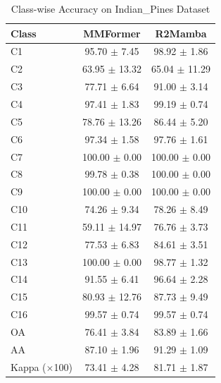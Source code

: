 \begin{table}[htbp]
\centering
\caption{Class-wise Accuracy on Indian\_Pines Dataset}
\label{tab:indian_pines_classwise}
\begin{tabular}{lcc}
\toprule
Class & MMFormer & R2Mamba \\
\midrule
C1 & 95.70 $\pm$ 7.45 & 98.92 $\pm$ 1.86 \\
C2 & 63.95 $\pm$ 13.32 & 65.04 $\pm$ 11.29 \\
C3 & 77.71 $\pm$ 6.64 & 91.00 $\pm$ 3.14 \\
C4 & 97.41 $\pm$ 1.83 & 99.19 $\pm$ 0.74 \\
C5 & 78.76 $\pm$ 13.26 & 86.44 $\pm$ 5.20 \\
C6 & 97.34 $\pm$ 1.58 & 97.76 $\pm$ 1.61 \\
C7 & 100.00 $\pm$ 0.00 & 100.00 $\pm$ 0.00 \\
C8 & 99.78 $\pm$ 0.38 & 100.00 $\pm$ 0.00 \\
C9 & 100.00 $\pm$ 0.00 & 100.00 $\pm$ 0.00 \\
C10 & 74.26 $\pm$ 9.34 & 78.26 $\pm$ 8.49 \\
C11 & 59.11 $\pm$ 14.97 & 76.76 $\pm$ 3.73 \\
C12 & 77.53 $\pm$ 6.83 & 84.61 $\pm$ 3.51 \\
C13 & 100.00 $\pm$ 0.00 & 98.77 $\pm$ 1.32 \\
C14 & 91.55 $\pm$ 6.41 & 96.64 $\pm$ 2.28 \\
C15 & 80.93 $\pm$ 12.76 & 87.73 $\pm$ 9.49 \\
C16 & 99.57 $\pm$ 0.74 & 99.57 $\pm$ 0.74 \\
\midrule
OA & 76.41 $\pm$ 3.84 & 83.89 $\pm$ 1.66 \\
AA & 87.10 $\pm$ 1.96 & 91.29 $\pm$ 1.09 \\
Kappa ($\times$100) & 73.41 $\pm$ 4.28 & 81.71 $\pm$ 1.87 \\
\bottomrule
\end{tabular}
\end{table}